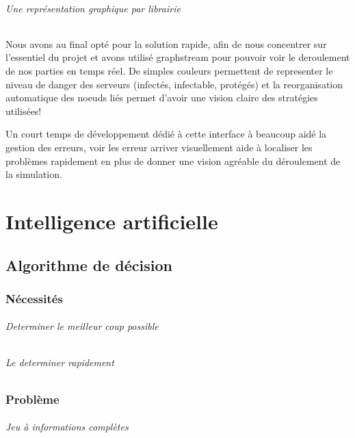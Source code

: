 \documentclass{scrreprt}
\begin{document}
    \paragraph{Une représentation graphique par librairie}
    Nous avons au final opté pour la solution rapide, afin de nous concentrer
    sur l'essentiel du projet et avons utilisé graphstream pour pouvoir voir
    le deroulement de nos parties en temps réel.
    De simples couleurs permettent de representer le niveau de danger des
    serveurs (infectés, infectable, protégés) et la reorganisation
    automatique des noeuds liés permet d'avoir une vision claire des
    stratégies utilisées!

    \begin{result}
        Un court temps de développement dédié à cette interface à beaucoup
        aidé la gestion des erreurs, voir les erreur arriver visuellement
        aide à localiser les problèmes rapidement en plus de donner une
        vision agréable du déroulement de la simulation.
    \end{result}

    \part{Intelligence artificielle}

    \chapter{Algorithme de décision}

    \section{Nécessités}

    \paragraph{Determiner le meilleur coup possible}

    \paragraph{Le determiner rapidement}

    \section{Problème}

    \paragraph{Jeu à informations complètes}
\end{document}
